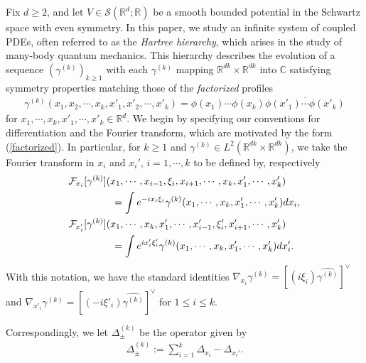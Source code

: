 \documentclass[reqno]{amsart}
\numberwithin{equation}{section}
\theoremstyle{remark}
\begin{document}
Fix $d\geq 2$, and let $V\in\mathcal{S}(\mathbb{R}^d;\mathbb{R})$ be a smooth bounded potential in the Schwartz space with even symmetry.  In this paper, we study an infinite system of coupled PDEs, often referred to as the {\it Hartree hierarchy}, which arises in the study of many-body quantum mechanics.  This hierarchy describes the evolution of a sequence $(\gamma^{(k)})_{k\geq 1}$ with each $\gamma^{(k)}$ mapping $\mathbb{R}^{dk}\times\mathbb{R}^{dk}$ into $\mathbb{C}$ satisfying symmetry properties matching those of the {\it factorized} profiles 
\begin{align}
\gamma^{(k)}(x_1,x_2,\cdots,x_k,x'_1,x'_2,\cdots,x'_k)=\phi(x_1)\cdots\phi(x_k)\overline{\phi(x'_1)\cdots\phi(x'_k)}\label{factorized}
\end{align}
for $x_1,\cdots,x_k,x'_1,\cdots,x'_k\in\mathbb{R}^d$.  We begin by specifying our conventions for differentiation and the Fourier transform, which are motivated by the form (\ref{factorized}).  In particular, for $k\geq 1$ and $\gamma^{(k)}\in L^2(\mathbb{R}^{dk}\times \mathbb{R}^{dk})$, we take the Fourier transform in $x_i$ and $x_i'$, $i=1,\cdots, k$ to be defined by, respectively
\begin{align*}
&\mathcal{F}_{x_i}[\gamma^{(k)}](x_1,\cdots,x_{i-1},\xi_i,x_{i+1},\cdots, x_k,x'_1,\cdots,x'_k)\\
&\hspace{0.6in}=\int e^{-ix_i\xi_i}\gamma^{(k)}(x_1,\cdots,x_k,x'_1,\cdots,x'_k)dx_i,\\
&\mathcal{F}_{x'_i}[\gamma^{(k)}](x_1,\cdots,x_k,x'_1,\cdots,x'_{i-1},\xi'_i,x'_{i+1},\cdots, x'_k)\\
&\hspace{0.6in}=\int e^{ix'_i\xi'_i}\gamma^{(k)}(x_1,\cdots,x_k,x'_1,\cdots,x'_k)dx'_i.
\end{align*}
With this notation, we have the standard identities $\nabla_{x_i} \gamma^{(k)}=[(i\xi_i)\widehat{\gamma^{(k)}}]^\vee$ and 
$\nabla_{x'_i} \gamma^{(k)}=[(-i\xi'_i)\widehat{\gamma^{(k)}}]^\vee$ for $1\leq i\leq k$.

Correspondingly, we let $\Delta^{(k)}_\pm$ be the operator given by
\begin{align*}
\Delta^{(k)}_\pm:=\sum_{i=1}^k\Delta_{x_i}-\Delta_{x_i'}.
\end{align*}
\end{document}
